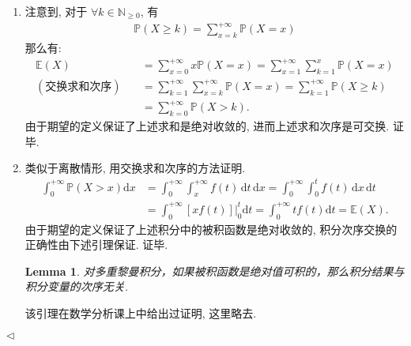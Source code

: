 \documentclass[11pt]{article}
\newtheorem{lemma}[theorem]{Lemma}
\newenvironment{answer}[1][Solution]{\begin{trivlist}
    \item[\hskip \labelsep {\bfseries #1.}\hskip \labelsep]}{\hfill$\lhd$\end{trivlist}}
\newcommand\1{\mathds{1}}
\newcommand\E{\mathbb{E}}
\newcommand\N{\mathbb{N}}
\newcommand\PP{\mathbb{P}}
\newcommand\dd{\mathrm{d}}
\begin{document}
\begin{answer}
    \begin{enumerate}[label=(\arabic*)]
        \item 注意到, 对于 $\forall k\in \N_{\ge 0}$, 有
        \begin{align*}
            \PP(X\ge k) = \sum_{x=k}^{+\infty}\PP(X=x) 
        \end{align*}
        那么有:
        \begin{align*}
            \E(X) &= \sum_{x=0}^{+\infty} x\PP(X=x) = \sum_{x=1}^{+\infty} \sum_{k=1}^{x} \PP(X=x) \\
            (\text{交换求和次序}) \quad &= \sum_{k=1}^{+\infty} \sum_{x=k}^{+\infty} \PP(X=x) = \sum_{k=1}^{+\infty} \PP(X\ge k) \\
            &= \sum_{k=0}^{+\infty} \PP(X>k).
        \end{align*}
        由于期望的定义保证了上述求和是绝对收敛的, 进而上述求和次序是可交换. 证毕.
        \item 类似于离散情形, 用交换求和次序的方法证明.
        \begin{align*}
            \int_{0}^{+\infty} \PP(X>x)\dd x &= \int_{0}^{+\infty} \int_{x}^{+\infty} f(t)\,\dd t\,\dd x = \int_{0}^{+\infty} \int_{0}^{t} f(t)\,\dd x\,\dd t \\
            &= \int_{0}^{+\infty} [xf(t)] \bigg|_{0}^{t}\dd t = \int_{0}^{+\infty} tf(t)\dd t = \E(X).
        \end{align*}
        由于期望的定义保证了上述积分中的被积函数是绝对收敛的, 积分次序交换的正确性由下述引理保证. 证毕.
        \begin{lemma}
            对多重黎曼积分，如果被积函数是绝对值可积的，那么积分结果与积分变量的次序无关.
        \end{lemma}
        该引理在数学分析课上中给出过证明, 这里略去. 
    \end{enumerate}
\end{answer}
\end{document}
